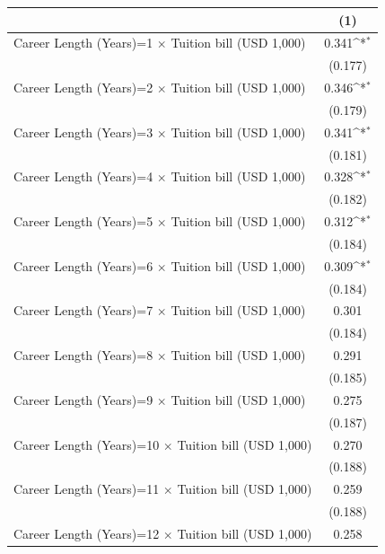 {
\def\sym#1{\ifmmode^{#1}\else\(^{#1}\)\fi}
\begin{tabular}{l*{1}{c}}
\hline\hline
                    &\multicolumn{1}{c}{(1)}         \\
\hline
Career Length (Years)=1 $\times$ Tuition bill (USD 1,000)&       0.341\sym{*}  \\
                    &     (0.177)         \\
[1em]
Career Length (Years)=2 $\times$ Tuition bill (USD 1,000)&       0.346\sym{*}  \\
                    &     (0.179)         \\
[1em]
Career Length (Years)=3 $\times$ Tuition bill (USD 1,000)&       0.341\sym{*}  \\
                    &     (0.181)         \\
[1em]
Career Length (Years)=4 $\times$ Tuition bill (USD 1,000)&       0.328\sym{*}  \\
                    &     (0.182)         \\
[1em]
Career Length (Years)=5 $\times$ Tuition bill (USD 1,000)&       0.312\sym{*}  \\
                    &     (0.184)         \\
[1em]
Career Length (Years)=6 $\times$ Tuition bill (USD 1,000)&       0.309\sym{*}  \\
                    &     (0.184)         \\
[1em]
Career Length (Years)=7 $\times$ Tuition bill (USD 1,000)&       0.301         \\
                    &     (0.184)         \\
[1em]
Career Length (Years)=8 $\times$ Tuition bill (USD 1,000)&       0.291         \\
                    &     (0.185)         \\
[1em]
Career Length (Years)=9 $\times$ Tuition bill (USD 1,000)&       0.275         \\
                    &     (0.187)         \\
[1em]
Career Length (Years)=10 $\times$ Tuition bill (USD 1,000)&       0.270         \\
                    &     (0.188)         \\
[1em]
Career Length (Years)=11 $\times$ Tuition bill (USD 1,000)&       0.259         \\
                    &     (0.188)         \\
[1em]
Career Length (Years)=12 $\times$ Tuition bill (USD 1,000)&       0.258         \\

\end{tabular}}
